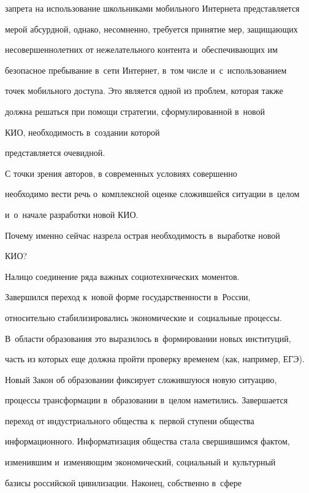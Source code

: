 запрета на использование школьниками мобильного Интернета представляется


мерой абсурдной, однако, несомненно, требуется принятие мер, защищающих


несовершеннолетних от нежелательного контента и~обес\-пе\-чи\-ва\-ющих им


безопасное пребывание в~сети Интернет, в~том числе и~с~использованием


точек мобильного доступа. Это является одной из проблем, которая также


должна решаться при помощи стратегии, сформулированной в~новой


КИО, необходимость в~создании которой


представляется очевидной.





     С точки зрения авторов, в современных условиях совершенно


необходимо вести речь о~комплексной оценке сложившейся ситуации в~целом


и~о~начале разработки новой КИО.


Почему именно сейчас назрела острая необходимость в~выработке новой


КИО?





     Налицо соединение ряда важных социотехнических моментов.


Завершился переход к~новой форме государственности в~России,


относительно стабилизировались экономические и~социальные процессы.


В~области образования это выразилось в~формировании новых институций,


часть из которых еще должна пройти проверку временем (как, например, ЕГЭ).


Новый Закон об образовании фиксирует сложившуюся новую ситуацию,


процессы трансформации в~образовании в~целом наметились. Завершается


переход от индустриального общества к~первой ступени общества


информационного. Информатизация общества стала свершившимся фактом,


изменившим и~изменяющим экономический, социальный и~культурный


базисы российской цивилизации. Наконец, собственно в~сфере


